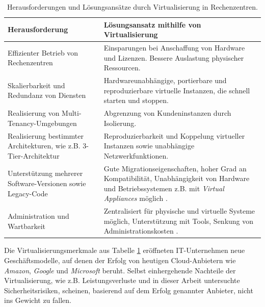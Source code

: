 \documentclass[../main.tex]{subfiles}
\begin{document}
		\vspace{0.5cm}
		\begin{table}[htp]
			\begin{centering}
			\begin{tabularx}{\textwidth}{>{\hsize=1\hsize}X|>{\hsize=1\hsize}X}
				\hline
				\textbf{Herausforderung} & \textbf{Lösungsansatz mithilfe von Virtualisierung} \\
				\hline
				Effizienter Betrieb von Rechenzentren
				& Einsparungen bei Anschaffung von Hardware und Lizenzen. Bessere Auslastung physischer Ressourcen. \\
				\hline
				Skalierbarkeit und Redundanz von Diensten
				& Hardwareunabhängige, portierbare und reproduzierbare virtuelle Instanzen, die schnell starten und stoppen. \\
				\hline
				Realisierung von Multi-Tenancy-Umgebungen
				& Abgrenzung von Kundeninstanzen durch Isolierung. \\
				\hline
				Realisierung bestimmter Architekturen, wie z.B. 3-Tier-Architektur
				& Reproduzierbarkeit und Koppelung virtueller Instanzen sowie unabhängige Netzwerkfunktionen. \\
				\hline
				Unterstützung mehrerer Software-Versionen sowie Legacy-Code
				& Gute Migrationseigenschaften, hoher Grad an Kompatibilität, Unabhängigkeit von Hardware und Betriebssystemen z.B. mit \emph{Virtual Appliances} möglich \cite[S.672f.]{tanenbaumOS}.\\
				\hline
				Administration und Wartbarkeit
				& Zentralisiert für physische und virtuelle Systeme möglich, Unterstützung mit Tools, Senkung von Administrationskosten \cite[S.1]{bsiVirt}. \\
				\hline
		  \end{tabularx}
			\vspace{0.5cm}
			\caption{Herausforderungen und Lösungsansätze durch Virtualisierung in Rechenzentren.}
			\label{tab:virtAdvantages}
			\end{centering}
		\end{table}

		Die Virtualisierungsmerkmale aus Tabelle \ref{tab:virtAdvantages} eröffneten IT-Unternehmen neue Geschäftsmodelle, auf denen der Erfolg von heutigen Cloud-Anbietern wie \emph{Amazon}, \emph{Google} und \emph{Microsoft} beruht. Selbst einhergehende Nachteile der Virtualisierung, wie z.B. Leistungsverluste und in dieser Arbeit untersuchte Sicherheitsrisiken, scheinen, basierend auf dem Erfolg genannter Anbieter, nicht ins Gewicht zu fallen.
\end{document}

